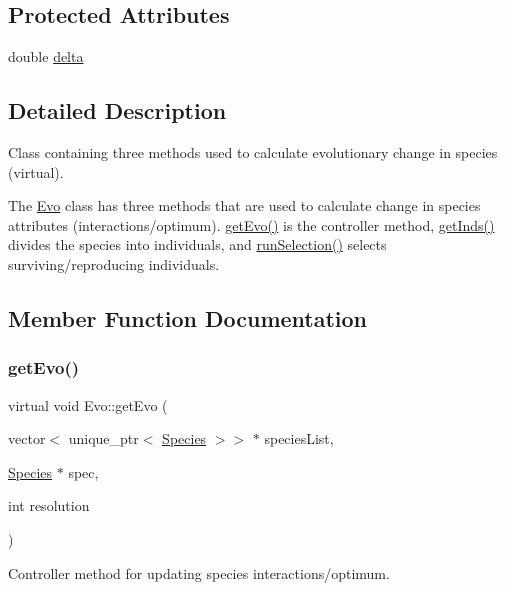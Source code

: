 \subsection*{Protected Attributes}
\begin{DoxyCompactItemize}
\item 
double \hyperlink{classEvo_a8f02598dfb1249ad135fbc741c27e0e0}{delta}
\end{DoxyCompactItemize}


\subsection{Detailed Description}
Class containing three methods used to calculate evolutionary change in species (virtual). 

The \hyperlink{classEvo}{Evo} class has three methods that are used to calculate change in species attributes (interactions/optimum). \hyperlink{classEvo_a8c5208c00d1ee2fe9bef41bdd7fe0ab7}{get\+Evo()} is the controller method, \hyperlink{classEvo_a88b5e0b1053cf1b4b473a08e2f03db92}{get\+Inds()} divides the species into individuals, and \hyperlink{classEvo_a10ff4eefe3967ff5cf5f820890c18079}{run\+Selection()} selects surviving/reproducing individuals. 

\subsection{Member Function Documentation}
\hypertarget{classEvo_a8c5208c00d1ee2fe9bef41bdd7fe0ab7}{}\label{classEvo_a8c5208c00d1ee2fe9bef41bdd7fe0ab7} 
\subsubsection{\texorpdfstring{get\+Evo()}{getEvo()}}
{\footnotesize\ttfamily virtual void Evo\+::get\+Evo (\begin{DoxyParamCaption}\item[{vector$<$ unique\+\_\+ptr$<$ \hyperlink{classSpecies}{Species} $>$$>$ $\ast$}]{species\+List,  }\item[{\hyperlink{classSpecies}{Species} $\ast$}]{spec,  }\item[{int}]{resolution }\end{DoxyParamCaption})\hspace{0.3cm}{\ttfamily [pure virtual]}}



Controller method for updating species interactions/optimum. 


